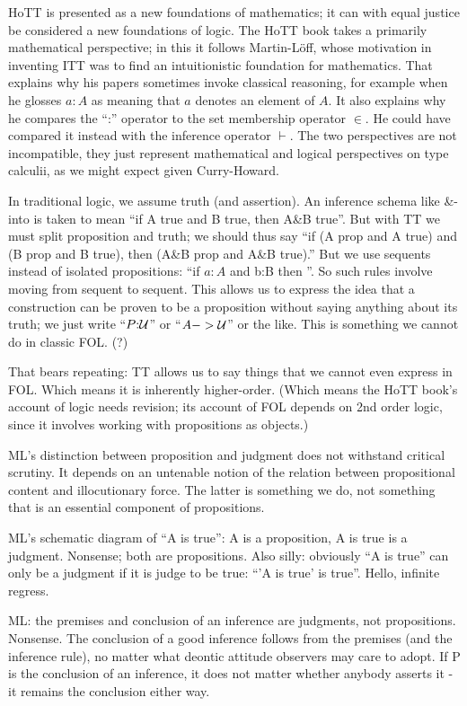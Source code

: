 \documentclass{article}
\begin{document}
HoTT is presented as a new foundations of mathematics; it can with
equal justice be considered a new foundations of logic.  The HoTT book
takes a primarily mathematical perspective; in this it follows
Martin-Löff, whose motivation in inventing ITT was to find an
intuitionistic foundation for mathematics.  That explains why his
papers sometimes invoke classical reasoning, for example when he
glosses \(a{:}A\) as meaning that \(a\) denotes an element of \(A\).  It
also explains why he compares the ``:'' operator to the set membership
operator \(\in\).  He could have compared it instead with the
inference operator \(\vdash\).  The two perspectives are not
incompatible, they just represent mathematical and logical
perspectives on type calculii, as we might expect given Curry-Howard.

In traditional logic, we assume truth (and assertion).  An inference
schema like \&-into is taken to mean ``if A true and B true, then A\&B
true''.  But with TT we must split proposition and truth; we should
thus say ``if (A prop and A true) and (B prop and B true), then (A\&B
prop and A\&B true).''  But we use sequents instead of isolated
propositions: ``if \(a{:}A\) and b{:}B then \abAB''.  So such
rules involve moving from sequent to sequent.  This allows us to
express the idea that a construction can be proven to be a proposition
without saying anything about its truth; we just write
``\(P{:}\mathcal{U}\)'' or ``\(A->\mathcal{U}\)'' or the like.  This is something
we cannot do in classic FOL. (?)

That bears repeating: TT allows us to say things that we cannot even
express in FOL.  Which means it is inherently higher-order.  (Which
means the HoTT book's account of logic needs revision; its account of
FOL depends on 2nd order logic, since it involves working with
propositions as objects.)

ML's distinction  between proposition and judgment  does not withstand
critical scrutiny.  It depends on  an untenable notion of the relation
between propositional content and  illocutionary force.  The latter is
something  we do,  not something  that  is an  essential component  of
propositions.

ML's schematic diagram of ``A is true'': A is a proposition, A is true
is a judgment.  Nonsense; both are propositions.  Also silly:
obviously ``A is true'' can only be a judgment if it is judge to be
true: ``'A is true' is true''.  Hello, infinite regress.

ML: the premises and conclusion of an inference are judgments, not
propositions.  Nonsense.  The conclusion of a good inference follows
from the premises (and the inference rule), no matter what deontic
attitude observers may care to adopt.  If P is the conclusion of an
inference, it does not matter whether anybody asserts it - it remains
the conclusion either way.
\end{document}
